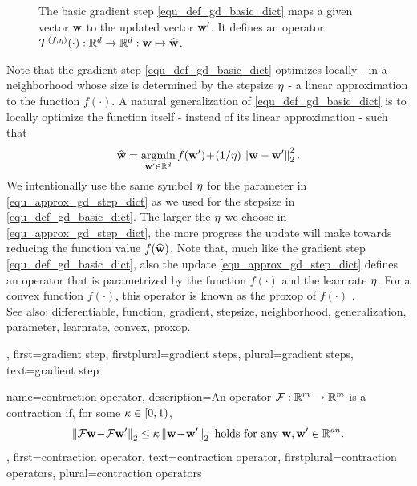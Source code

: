 {{\begin{figure}[H]
\begin{center}
			\end{center}
			\caption{The basic \gls{gradient} step \eqref{equ_def_gd_basic_dict} maps a given vector ${\bf w}$ 
			to the updated vector ${\bf w}'$. It defines an operator 
			$\mathcal{T}^{(f,\eta)}(\cdot): \mathbb{R}^{d} \rightarrow \mathbb{R}^{d}:
			 {\bf w} \mapsto \widehat{{\bf w}}$.}
			\label{fig_basic_GD_step_single_dict}
		\end{figure}
		Note that the \gls{gradient} step \eqref{equ_def_gd_basic_dict} optimizes locally - 
		in a \gls{neighborhood} whose size is determined by the \gls{stepsize} $\eta$ - a linear approximation 
		to the \gls{function} $f(\cdot)$. A natural \gls{generalization} of \eqref{equ_def_gd_basic_dict} is to locally 
		optimize the \gls{function} itself - instead of its linear approximation - such that
		\begin{align} 
		\label{equ_approx_gd_step_dict}
		\widehat{{\bf w}} = \operatorname*{argmin}_{{\bf w}' \in \mathbb{R}^{d}} f({\bf w}')\!+\!(1/\eta)\left\Vert {{\bf w}-{\bf w}'} \right\Vert_{2}^2. 
		\end{align}
		We intentionally use the same symbol $\eta$ for the \gls{parameter} in \eqref{equ_approx_gd_step_dict} 
		as we used for the \gls{stepsize} in \eqref{equ_def_gd_basic_dict}. The larger the $\eta$ we choose in 
		\eqref{equ_approx_gd_step_dict}, the more progress the update will make towards reducing the 
		\gls{function} value $f(\widehat{{\bf w}})$. Note that, much like the \gls{gradient} step \eqref{equ_def_gd_basic_dict}, 
		also the update \eqref{equ_approx_gd_step_dict} defines an operator 
		that is parametrized by the \gls{function} $f(\cdot)$ and the \gls{learnrate} $\eta$. For a \gls{convex} \gls{function}  
		$f(\cdot)$, this operator is known as the \gls{proxop} of $f(\cdot)$ \cite{ProximalMethods}. 
					\\ 
		See also: \gls{differentiable}, \gls{function}, \gls{gradient}, \gls{stepsize}, \gls{neighborhood}, \gls{generalization}, \gls{parameter}, \gls{learnrate}, \gls{convex}, \gls{proxop}.},
	first={gradient step},
	firstplural={gradient steps},
	plural={gradient steps},
	text={gradient step}
}

{name={contraction operator},
	description={An operator $\mathcal{F}: \mathbb{R}^{m} \rightarrow \mathbb{R}^{m}$
		is a contraction if, for some $\kappa \in [0,1)$,
		\begin{equation} 
			\nonumber
			\left\Vert { \mathcal{F}{\bf w}\!-\!\mathcal{F}{\bf w}'} \right\Vert_{2}  \leq  \kappa	\left\Vert {{\bf w}\!-\!{\bf w}'} \right\Vert_{2} \mbox{ holds for any } {\bf w},{\bf w}' \in \mathbb{R}^{d n}.
		\end{equation}
	},
	first={contraction operator},
	text={contraction operator}, 
	firstplural={contraction operators}, 
	plural={contraction operators}
}
	

